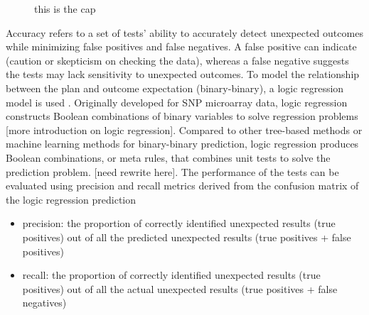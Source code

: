 \documentclass[
  12pt,
]{interact}
\providecommand{\tightlist}{%
  \setlength{\itemsep}{0pt}\setlength{\parskip}{0pt}}\usepackage{longtable,booktabs,array}
\begin{document}
\label{cell-fig-metric-calc}
\begin{figure}[H]


\caption{\label{fig-metric-calc}this is the cap}

\end{figure}%

Accuracy refers to a set of tests' ability to accurately detect
unexpected outcomes while minimizing false positives and false
negatives. A false positive can indicate (caution or skepticism on
checking the data), whereas a false negative suggests the tests may lack
sensitivity to unexpected outcomes. To model the relationship between
the plan and outcome expectation (binary-binary), a logic regression
model is used \citep{ruczinski_logic_2003}. Originally developed for SNP
microarray data, logic regression constructs Boolean combinations of
binary variables to solve regression problems {[}more introduction on
logic regression{]}. Compared to other tree-based methods or machine
learning methods for binary-binary prediction, logic regression produces
Boolean combinations, or meta rules, that combines unit tests to solve
the prediction problem. {[}need rewrite here{]}. The performance of the
tests can be evaluated using precision and recall metrics derived from
the confusion matrix of the logic regression prediction

\begin{itemize}
\tightlist
\item
  precision: the proportion of correctly identified unexpected results
  (true positives) out of all the predicted unexpected results (true
  positives + false positives)
\item
  recall: the proportion of correctly identified unexpected results
  (true positives) out of all the actual unexpected results (true
  positives + false negatives)
\end{itemize}
\end{document}

